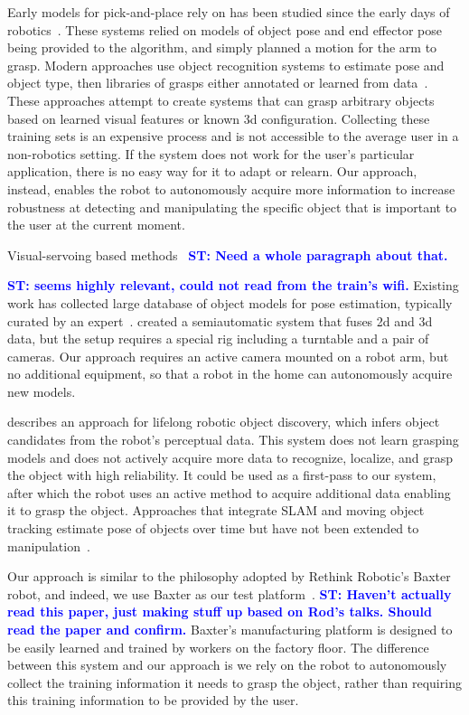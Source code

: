 \documentclass[graybox]{svmult}
\newcommand{\stnote}[1]{\textcolor{blue}{\textbf{ST: #1}}}
\begin{document}
Early models for pick-and-place rely on has been studied since the
early days of robotics~\citep{brooks83, lozano89}.  These systems
relied on models of object pose and end effector pose being provided to the
algorithm, and simply planned a motion for the arm to grasp.  Modern
approaches use object recognition systems to estimate pose and object
type, then libraries of grasps either annotated or learned from
data~\citep{saxena08, goldfeder09, morales03}.  These approaches
attempt to create systems that can grasp arbitrary objects based on
learned visual features or known 3d configuration.  Collecting these
training sets is an expensive process and is not accessible to the
average user in a non-robotics setting.  If the system does not work
for the user's particular application, there is no easy way for it to
adapt or relearn.  Our approach, instead, enables the robot to
autonomously acquire more information to increase robustness at
detecting and manipulating the specific object that is important to
the user at the current moment.

Visual-servoing based methods~\citep{chaumette06} \stnote{Need a whole
  paragraph about that. }

\stnote{\citet{ciocarlie14} seems highly relevant, could not read from
  the train's wifi.}  Existing work has collected large database of
object models for pose estimation, typically curated by an
expert~\citep{lai11}.  \citet{kasper12} created a semiautomatic system
that fuses 2d and 3d data, but the setup requires a special rig
including a turntable and a pair of cameras.  Our approach requires an
active camera mounted on a robot arm, but no additional equipment, so
that a robot in the home can autonomously acquire new models.

\citet{collect14} describes an approach for lifelong robotic object
discovery, which infers object candidates from the robot's perceptual
data.  This system does not learn grasping models and does not
actively acquire more data to recognize, localize, and grasp the
object with high reliability.  It could be used as a first-pass to
our system, after which the robot uses an active method to acquire
additional data enabling it to grasp the object.  Approaches that
integrate SLAM and moving object tracking estimate pose of objects
over time but have not been extended to manipulation~\citep{wang07,
  gallagher09, salas-moreno13, selvatici08}.

Our approach is similar to the philosophy adopted by Rethink Robotic's
Baxter robot, and indeed, we use Baxter as our test
platform~\citep{fitzgerald13}.  \stnote{Haven't actually read this
  paper, just making stuff up based on Rod's talks.  Should read the
  paper and confirm.}  Baxter's manufacturing platform is designed to
be easily learned and trained by workers on the factory floor.  The
difference between this system and our approach is we rely on the
robot to autonomously collect the training information it needs to
grasp the object, rather than requiring this training information to
be provided by the user.
\end{document}
